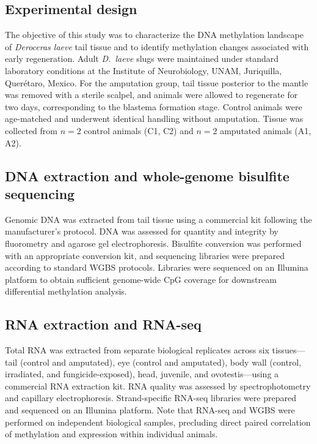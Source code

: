 \documentclass[12pt]{article}
\begin{document}
\subsection*{Experimental design}

The objective of this study was to characterize the DNA methylation landscape of \textit{Deroceras laeve} tail tissue and to identify methylation changes associated with early regeneration. Adult \textit{D.\ laeve} slugs were maintained under standard laboratory conditions at the Institute of Neurobiology, UNAM, Juriquilla, Quer\'{e}taro, Mexico. For the amputation group, tail tissue posterior to the mantle was removed with a sterile scalpel, and animals were allowed to regenerate for two days, corresponding to the blastema formation stage. Control animals were age-matched and underwent identical handling without amputation. Tissue was collected from $n = 2$ control animals (C1, C2) and $n = 2$ amputated animals (A1, A2).

\subsection*{DNA extraction and whole-genome bisulfite sequencing}

Genomic DNA was extracted from tail tissue using a commercial kit following the manufacturer's protocol. DNA was assessed for quantity and integrity by fluorometry and agarose gel electrophoresis. Bisulfite conversion was performed with an appropriate conversion kit, and sequencing libraries were prepared according to standard WGBS protocols. Libraries were sequenced on an Illumina platform to obtain sufficient genome-wide CpG coverage for downstream differential methylation analysis.

\subsection*{RNA extraction and RNA-seq}

Total RNA was extracted from separate biological replicates across six tissues---tail (control and amputated), eye (control and amputated), body wall (control, irradiated, and fungicide-exposed), head, juvenile, and ovotestis---using a commercial RNA extraction kit. RNA quality was assessed by spectrophotometry and capillary electrophoresis. Strand-specific RNA-seq libraries were prepared and sequenced on an Illumina platform. Note that RNA-seq and WGBS were performed on independent biological samples, precluding direct paired correlation of methylation and expression within individual animals.
\end{document}
